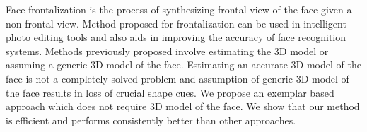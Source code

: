 Face frontalization is the process of synthesizing frontal view of the face given a non-frontal view. 
Method proposed for frontalization can be used in intelligent photo editing tools and also aids in improving the accuracy of face
 recognition systems. Methods previously proposed involve estimating the 3D model or assuming a generic
3D model of the face. Estimating an accurate 3D model of the face is not a completely solved problem and 
assumption of generic 3D model of the face results in loss of crucial shape cues. We propose an exemplar
based approach which does not require 3D model of the face. We show that our method is efficient and performs consistently
better than other approaches.
